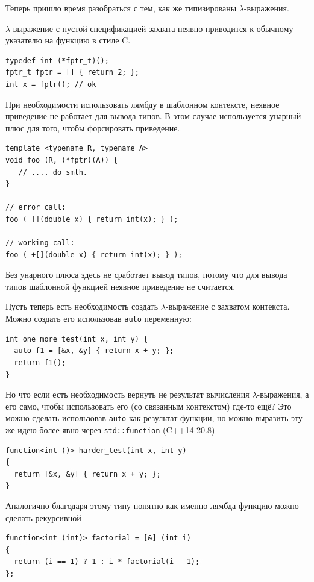 \documentclass[a4paper,12pt,oneside]{book}
\begin{document}
Теперь пришло время разобраться с тем, как же типизированы $\lambda$-выражения.

$\lambda$-выражение с пустой спецификацией захвата неявно приводится к обычному указателю на функцию в стиле C.

\begin{lstlisting}
typedef int (*fptr_t)();
fptr_t fptr = [] { return 2; };
int x = fptr(); // ok
\end{lstlisting}

При необходимости использовать лямбду в шаблонном контексте, неявное приведение не работает для вывода типов. В этом случае используется унарный плюс для того, чтобы форсировать приведение.

\begin{lstlisting}
template <typename R, typename A>
void foo (R, (*fptr)(A)) {
   // .... do smth.
}

// error call:
foo ( [](double x) { return int(x); } );

// working call:
foo ( +[](double x) { return int(x); } );
\end{lstlisting}

Без унарного плюса здесь не сработает вывод типов, потому что для вывода типов шаблонной функцией неявное приведение не считается.

Пусть теперь есть необходимость создать $\lambda$-выражение с захватом контекста. Можно создать его использовав \lstinline!auto! переменную:

\begin{lstlisting}
int one_more_test(int x, int y) {
  auto f1 = [&x, &y] { return x + y; };
  return f1(); 
}
\end{lstlisting}

Но что если есть необходимость вернуть не результат вычисления $\lambda$-выражения, а его само, чтобы использовать его (со связанным контекстом) где-то ещё? Это можно сделать использовав \lstinline!auto! как результат функции, но можно выразить эту же идею более явно через \lstinline!std::function! (C++14 20.8)
 
\begin{lstlisting}
function<int ()> harder_test(int x, int y)
{
  return [&x, &y] { return x + y; };
}
\end{lstlisting}

Аналогично благодаря этому типу понятно как именно лямбда-функцию можно сделать рекурсивной

\begin{lstlisting}
function<int (int)> factorial = [&] (int i) 
{ 
  return (i == 1) ? 1 : i * factorial(i - 1); 
};
\end{lstlisting}
\end{document}
